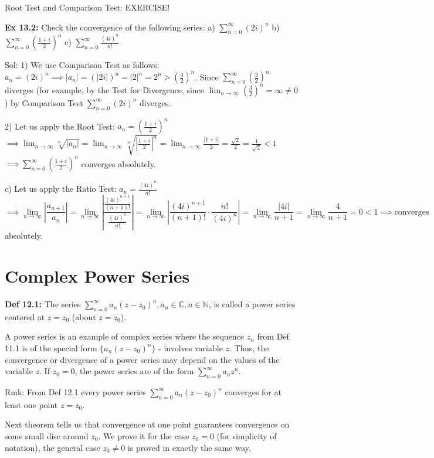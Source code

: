 \documentclass{article}
\begin{document}
Root Test and Comparison Test: EXERCISE!

\textbf{Ex 13.2:} Check the convergence of the following series:
a) $\sum_{n=0}^{\infty} (2i)^n$ b) $\sum_{n=0}^{\infty} \left(\frac{1+i}{2}\right)^n$ c) $\sum_{n=0}^{\infty} \frac{(4i)^n}{n!}$

Sol: 1) We use Comparison Test as follows: $a_n = (2i)^n \implies |a_n| = (|2i|)^n = |2|^n = 2^n > (\frac{3}{2})^n$. Since $\sum_{n=0}^{\infty} (\frac{3}{2})^n$ diverges (for example, by the Test for Divergence, since $\lim_{n \to \infty} (\frac{3}{2})^n = \infty \neq 0$) by Comparison Test $\sum_{n=0}^{\infty} (2i)^n$ diverges.

2) Let us apply the Root Test: $a_n = \left(\frac{1+i}{2}\right)^n$
$\implies \lim_{n \to \infty} \sqrt[n]{|a_n|} = \lim_{n \to \infty} \sqrt[n]{\left|\frac{1+i}{2}\right|^n} = \lim_{n \to \infty} \frac{|1+i|}{2} = \frac{\sqrt{2}}{2} = \frac{1}{\sqrt{2}} < 1$
$\implies \sum_{n=0}^{\infty} \left(\frac{1+i}{2}\right)^n$ converges absolutely.

c) Let us apply the Ratio Test: $a_n = \frac{(4i)^n}{n!}$
$$ \implies \lim_{n \to \infty} \left| \frac{a_{n+1}}{a_n} \right| = \lim_{n \to \infty} \left| \frac{\frac{(4i)^{n+1}}{(n+1)!}}{\frac{(4i)^n}{n!}} \right| = \lim_{n \to \infty} \left| \frac{(4i)^{n+1}}{(n+1)!} \cdot \frac{n!}{(4i)^n} \right| = \lim_{n \to \infty} \frac{|4i|}{n+1} = \lim_{n \to \infty} \frac{4}{n+1} = 0 < 1 \implies \text{converges} $$
absolutely.

\section{Complex Power Series}
\textbf{Def 12.1:} The series $\sum_{n=0}^{\infty} a_n(z-z_0)^n, a_n \in \mathbb{C}, n \in \mathbb{N}$, is called a power series centered at $z = z_0$ (about $z = z_0$).

A power series is an example of complex series where the sequence $z_n$ from Def 11.1 is of the special form $\{a_n(z-z_0)^n\}$ - involves variable $z$. Thus, the convergence or divergence of a power series may depend on the values of the variable $z$. If $z_0 = 0$, the power series are of the form $\sum_{n=0}^{\infty} a_n z^n$.

Rmk: From Def 12.1 every power series $\sum_{n=0}^{\infty} a_n(z-z_0)^n$ converges for at least one point $z = z_0$.

Next theorem tells us that convergence at one point guarantees convergence on some small disc around $z_0$. We prove it for the case $z_0 = 0$ (for simplicity of notation), the general case $z_0 \neq 0$ is proved in exactly the same way.
\end{document}
